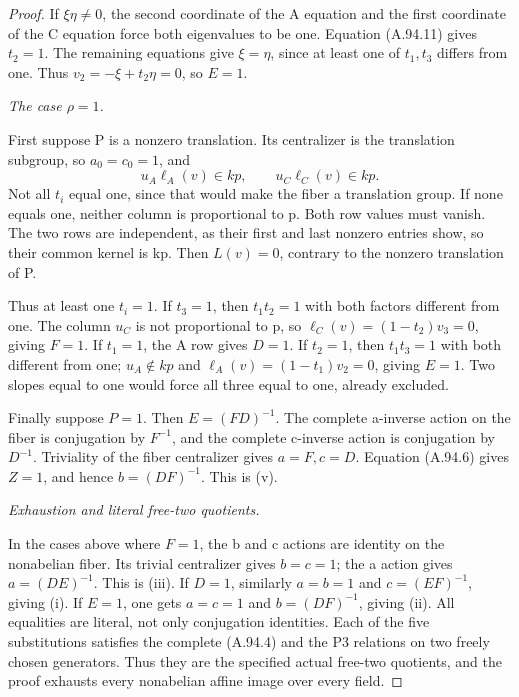 \begin{proof}
If \(\xi\eta\ne0\), the second coordinate of the A equation
and the first coordinate of the C equation force both
eigenvalues to be one. Equation (A.94.11) gives \(t_2=1\).
The remaining equations give \(\xi=\eta\), since at least
one of \(t_1,t_3\) differs from one. Thus
\(v_2=-\xi+t_2\eta=0\), so \(E=1\).

\emph{The case \(\rho=1\).}\par
First suppose P is a nonzero translation. Its centralizer
is the translation subgroup, so \(a_0=c_0=1\), and
\[
                 u_A\ell_A(v)\in kp,
                 \qquad u_C\ell_C(v)\in kp.
\tag{A.94.12}
\]
Not all \(t_i\) equal one, since that would make the fiber
a translation group. If none equals one, neither column is
proportional to p. Both row values must vanish. The two rows
are independent, as their first and last nonzero entries
show, so their common kernel is kp. Then \(L(v)=0\),
contrary to the nonzero translation of P.

Thus at least one \(t_i=1\). If \(t_3=1\), then
\(t_1t_2=1\) with both factors different from one.
The column \(u_C\) is not proportional to p, so
\(\ell_C(v)=(1-t_2)v_3=0\), giving \(F=1\).
If \(t_1=1\), the A row gives \(D=1\).
If \(t_2=1\), then \(t_1t_3=1\) with both different
from one; \(u_A\notin kp\) and
\(\ell_A(v)=(1-t_1)v_2=0\), giving \(E=1\).
Two slopes equal to one would force all three equal to one,
already excluded.

Finally suppose \(P=1\). Then \(E=(FD)^{-1}\).
The complete a-inverse action on the fiber is conjugation
by \(F^{-1}\), and the complete c-inverse action is
conjugation by \(D^{-1}\). Triviality of the fiber
centralizer gives \(a=F,c=D\). Equation (A.94.6) gives
\(Z=1\), and hence \(b=(DF)^{-1}\). This is (v).

\emph{Exhaustion and literal free-two quotients.}\par
In the cases above where \(F=1\), the b and c actions
are identity on the nonabelian fiber. Its trivial centralizer
gives \(b=c=1\); the a action gives \(a=(DE)^{-1}\).
This is (iii). If \(D=1\), similarly \(a=b=1\) and
\(c=(EF)^{-1}\), giving (i). If \(E=1\), one gets
\(a=c=1\) and \(b=(DF)^{-1}\), giving (ii).
All equalities are literal, not only conjugation identities.
Each of the five substitutions satisfies the complete
(A.94.4) and the P3 relations on two freely chosen generators.
Thus they are the specified actual free-two quotients, and
the proof exhausts every nonabelian affine image over every field.


\end{proof}
